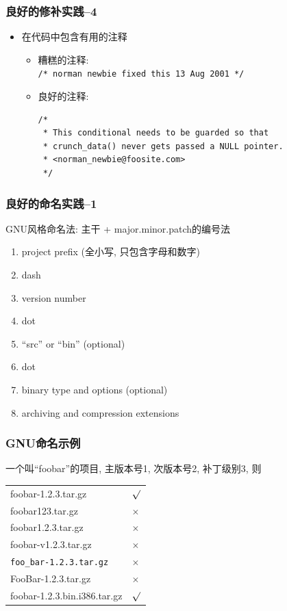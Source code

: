 \documentclass[compress]{beamer}
\begin{document}
\begin{frame}[fragile]
\frametitle{良好的修补实践--4}
\begin{itemize}

\item 在代码中包含有用的注释
    \begin{itemize}
    \item 糟糕的注释: \\
    \verb~/* norman newbie fixed this 13 Aug 2001 */~
    \item 良好的注释:
	  {\small
\begin{Verbatim}
/*
 * This conditional needs to be guarded so that
 * crunch_data() never gets passed a NULL pointer.
 * <norman_newbie@foosite.com>
 */
\end{Verbatim}
}

    \end{itemize}
\end{itemize}


\end{frame}

\begin{frame}
\frametitle{良好的命名实践--1}
\noindent GNU风格命名法: 主干 + major.minor.patch的编号法
  {\small
    \begin{enumerate}
    \item project prefix (全小写, 只包含字母和数字)
    \item dash
    \item version number
    \item dot
    \item ``src'' or ``bin'' (optional)
    \item dot
    \item binary type and options (optional)
    \item archiving and compression extensions
    \end{enumerate}
	}

\end{frame}

\begin{frame}[fragile]
\frametitle{GNU命名示例}
\noindent 一个叫``foobar''的项目, 主版本号1, 次版本号2, 补丁级别3, 则\\
\begin{tabular}{p{6cm}l}
foobar-1.2.3.tar.gz & $\surd$ \\
foobar123.tar.gz & $\times$ \\
foobar1.2.3.tar.gz & $\times$ \\
foobar-v1.2.3.tar.gz & $\times$ \\
\verb~foo_bar-1.2.3.tar.gz~ & $\times$ \\
FooBar-1.2.3.tar.gz & $\times$ \\
foobar-1.2.3.bin.i386.tar.gz & $\surd$ \\
\end{tabular}

\end{frame}
\end{document}
